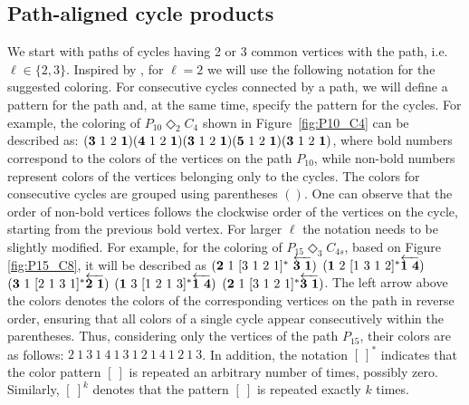 \documentclass{article}
\begin{document}


\subsection{Path-aligned cycle products}\label{subsec:cycles}
    We start with paths of cycles having 2 or 3 common vertices with the path, i.e. $\ell \in \{2,3\}$. Inspired by \cite{laiche2017packing}, for $\ell=2$ we will use the following notation for the suggested coloring. For consecutive cycles connected by a path, we will define a pattern for the path and, at the same time, specify the pattern for the cycles. For example, the coloring of $P_{10} \Diamond_2 C_4$ shown in Figure~\ref{fig:P10_C4} can be described as: $({\bf 3\ }1\ 2\ {\bf 1})({\bf 4\ }1\ 2\ {\bf 1})({\bf 3\ }1\ 2\ {\bf 1})({\bf 5\ }1\ 2\ {\bf 1})({\bf 3\ }1\ 2\ {\bf 1})$, where bold numbers correspond to the colors of the vertices on the path $P_{10}$, while non-bold numbers represent colors of the vertices belonging only to the cycles. The colors for consecutive cycles are grouped using parentheses $()$. 
    One can observe that the order of non-bold vertices follows the clockwise order of the vertices on the cycle, starting from the previous bold vertex.
For larger $\ell$ the notation needs to be slightly modified. For example, for the coloring of $P_{15} \Diamond_3 C_{4s}$, based on Figure \ref{fig:P15_C8}, it will be described as $({\bf 2}\ 1\ [3\ 1\ 2\ 1]^*\ \overleftarrow{{\bf 3\ 1}})$ $({\bf 1}\ 2\ [1\ 3\ 1\ 2]^* \overleftarrow{{\bf 1\ 4}})$ $({\bf 3}\ 1\ [2\ 1\ 3\ 1]^*\overleftarrow{{\bf 2\ 1}})$ $({\bf 1}\ 3\ [1\ 2\ 1\ 3]^*\overleftarrow{{\bf 1\ 4}})$ $({\bf 2}\ 1\ [3\ 1\ 2\ 1]^*\overleftarrow{{\bf 3\ 1}})$.
The left arrow above the colors denotes the colors of the corresponding vertices on the path in reverse order, ensuring that all colors of a single cycle appear consecutively within the parentheses. Thus, considering only the vertices of the path $P_{15}$, their colors are as follows: $2\ 1\ 3\ 1\ 4\ 1\ 3\ 1\ 2\ 1\ 4\ 1\ 2\ 1\ 3$. In addition, the notation $[\ ]^*$ indicates that the color pattern $[\ ]$ is repeated an arbitrary number of times, possibly zero. Similarly, $[\ ]^k$ denotes that the pattern $[\ ]$ is repeated exactly $k$ times.
\end{document}
